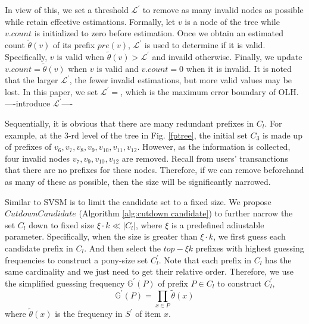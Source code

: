 \documentclass[conference]{IEEEtran}
\begin{document}
In view of this, {\color{red}we set a threshold $\mathcal{L}^{\prime}$ to remove as many invalid nodes as possible while retain effective estimations. Formally, let $v$ is a node of the tree while $v.count$ is initialized to zero before estimation. Once we obtain an estimated count $\tilde{\theta}(v)$ of its prefix $pre(v)$, $\mathcal{L}^{\prime}$ is used to determine if it is valid. Specifically, $v$ is valid when $\tilde{\theta}(v) > \mathcal{L}^{\prime}$ and invaild otherwise. Finally, we update $v.count=\tilde{\theta}(v)$ when $v$ is valid and $v.count=0$ when it is invalid. It is noted that the larger $\mathcal{L}^{\prime}$, the fewer invalid estimations, but more valid values may be lost. In this paper, we set $\mathcal{L}^{\prime} = $, which is the maximum error boundary of OLH.\\
----introduce $\mathcal{L}^{\prime}$----}

Sequentially, it is obvious that there are many redundant prefixes in $C_l$. For example, at the 3-rd level of the tree in Fig. \ref{fptree}, the initial set $C_3$ is made up of prefixes of $v_6,v_7,v_8,v_9,v_{10},v_{11},v_{12}$. However, as the information is collected, four invalid nodes $v_7,v_9,v_{10},v_{12}$ are removed. Recall from users' transanctions that there are no prefixes for these nodes. Therefore, if we can remove beforehand as many of these as possible, then the size will be significantly narrowed.

Similar to SVSM\cite{a2} is to limit the candidate set to a fixed size. We propose $CutdownCandidate$ (Algorithm \ref{alg:cutdown candidate}) to further narrow the set $C_l$ down to fixed size $\xi \cdot k \ll |C_l|$, where $\xi$ is a predefined adiustable parameter. Specifically, when the size is greater than $\xi \cdot k$, we first guess each candidate prefix in $C_l$. And then select the $top-\xi k$ prefixes with highest guessing frequencies to construct a pony-size set $C^{\prime}_{l}$. Note that each prefix in $C_l$ has the same cardinality and we just need to get their relative order. Therefore, we use the simplified guessing frequency $\mathbb{G}^{\prime}(P)$ of prefix $P \in C_l$ to construct $C^{\prime}_{l}$,
\begin{equation}
\mathbb{G}^{\prime}(P)=\prod_{x \in P} \tilde{\theta}(x) \label{simply gf}
\end{equation}
where $\tilde{\theta}(x)$ is the frequency in $S^{\prime}$ of item $x$.

\end{document}
